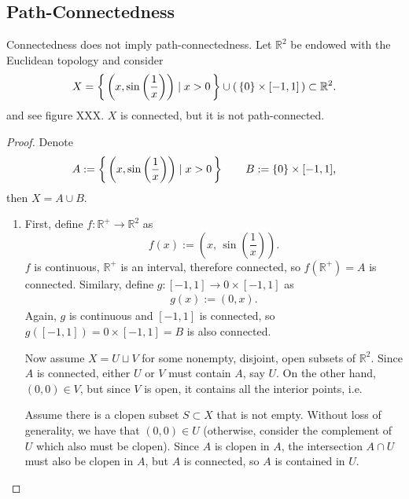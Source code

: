 \subsection{Path-Connectedness}
\begin{example}
    Connectedness does not imply path-connectedness. Let \(\mathbb{R}^2\) be endowed with the Euclidean topology and consider 
    \begin{equation*}
        X = \left\{\, \left(x, \sin\left(\frac{1}{x}\right)\right) \mid x > 0 \,\right\} \cup \left(\,\{0\} \times [-1, 1]\,\right) \subset \mathbb{R}^2 \text{.}
    \end{equation*}
    and see figure XXX. \(X\) is connected, but it is not path-connected.
\end{example}
\begin{proof}
    Denote
    \begin{equation*}
        A := \left\{\, \left(x, \sin\left(\frac{1}{x}\right)\right) \mid x > 0 \,\right\} \qquad B := \{0\} \times [-1, 1] \text{,}
    \end{equation*}
    then \(X = A \cup B\).
    \begin{enumerate}
        \item First, define \(f: \mathbb{R}^+ \longrightarrow \mathbb{R}^2\) as
        \begin{equation*}
            f(x) := \left(x,\, \sin\left(\frac{1}{x}\right)\right) \text{.}
        \end{equation*}
        \(f\) is continuous, \(\mathbb{R}^+\) is an interval, therefore connected, so \(f(\mathbb{R}^+) = A\) is connected. Similary, define \(g: [-1, 1] \longrightarrow {0} \times [-1, 1]\) as
        \begin{align*}
            g(x) := (0, x) \text{.}
        \end{align*}
        Again, \(g\) is continuous and \([-1, 1]\) is connected, so \(g([-1, 1]) = {0} \times [-1, 1] = B\) is also connected.

        Now assume \(X = U \sqcup V\) for some nonempty, disjoint, open subsets of \(\mathbb{R}^2\). Since \(A\) is connected, either \(U\) or \(V\) must contain \(A\), say \(U\). On the other hand, \((0, 0) \in V\), but since \(V\) is open, it contains all the interior points, i.e. 
        
        Assume there is a clopen subset \(S \subset X\) that is not empty. Without loss of generality, we have that \((0, 0) \in U\) (otherwise, consider the complement of \(U\) which also must be clopen). Since \(A\) is clopen in \(A\), the intersection \(A \cap U\) must also be clopen in \(A\), but \(A\) is connected, so \(A\) is contained in \(U\).


\end{enumerate}
\end{proof}
